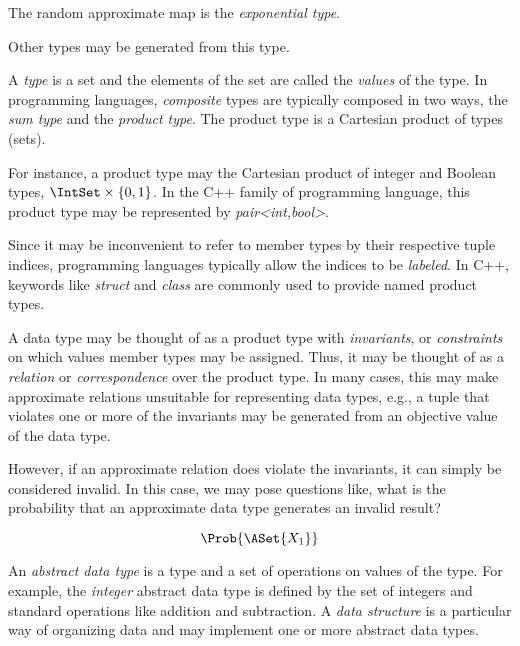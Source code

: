 \documentclass[ ../main.tex]{subfiles}
\begin{document}
The random approximate map is the \emph{exponential type}.

Other types may be generated from this type.


A \emph{type} is a set and the elements of the set are called the \emph{values} 
of the type. In programming languages, \emph{composite} types are typically composed in two ways, the \emph{sum type} and the \emph{product type}. The product type is a Cartesian product of types (sets).

For instance, a product type may the Cartesian product of integer and Boolean types, $\IntSet \times \{0,1\}$. In the C++ family of programming language, this product type may be represented by \emph{pair<int,bool>}.

Since it may be inconvenient to refer to member types by their respective tuple indices, programming languages typically allow the indices to be \emph{labeled}. In C++, keywords like \emph{struct} and \emph{class} are commonly used to provide named product types.

A data type may be thought of as a product type with \emph{invariants}, or \emph{constraints} on which values member types may be assigned. Thus, it may be thought of as a \emph{relation} or \emph{correspondence} over the product type. In many cases, this may make approximate relations unsuitable for representing data types, e.g., a tuple that violates one or more of the invariants may be generated from an objective value of the data type.

However, if an approximate relation does violate the invariants, it can simply be considered invalid. In this case, we may pose questions like, what is the probability that an approximate data type generates an invalid result?

\begin{equation}
\Prob{\ASet{X_1}}
\end{equation}



An \emph{abstract data type} is a type and a set of operations on values of the type. For example, the \emph{integer} abstract data type is defined by the set of integers and standard operations like addition and subtraction.
A \emph{data structure} is a particular way of organizing data and 
may implement one or more abstract data types.
\end{document}
